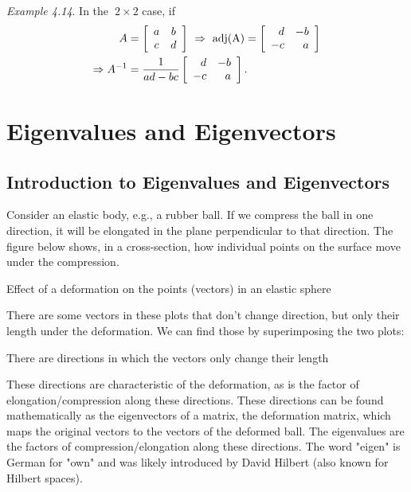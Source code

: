 \documentclass[
  letterpaper,
  DIV=11,
  numbers=noendperiod]{scrartcl}
\theoremstyle{remark}
\begin{document}
\emph{Example 4.14}. In the\textbf{~}\(2\times 2\) case, if
\[\begin{aligned}
A&=\left[ 
\begin{array}{cc}
a & b \\ 
c & d
\end{array}
\right] \ \Rightarrow  \  {\rm adj}({\rm A}) = \left[\begin{array}{rr}
d & -b \\ 
-c & a
\end{array}
\right]  \\
 \Rightarrow A^{-1} &= \frac{1}{ad-bc}\left[ 
\begin{array}{rr}
d & -b \\ 
-c & a
\end{array}
\right].  
\end{aligned}\]

\section{Eigenvalues and
Eigenvectors}\label{eigenvalues-and-eigenvectors}

\subsection{Introduction to Eigenvalues and
Eigenvectors}\label{introduction-to-eigenvalues-and-eigenvectors}

Consider an elastic body, e.g., a rubber ball. If we compress the ball
in one direction, it will be elongated in the plane perpendicular to
that direction. The figure below shows, in a cross-section, how
individual points on the surface move under the compression.

Effect of a deformation on the points (vectors) in an elastic sphere

There are some vectors in these plots that don't change direction, but
only their length under the deformation. We can find those by
superimposing the two plots:

There are directions in which the vectors only change their length

These directions are characteristic of the deformation, as is the factor
of elongation/compression along these directions. These directions can
be found mathematically as the eigenvectors of a matrix, the deformation
matrix, which maps the original vectors to the vectors of the deformed
ball. The eigenvalues are the factors of compression/elongation along
these directions. The word "eigen" is German for "own" and was likely
introduced by David Hilbert (also known for Hilbert spaces).
\end{document}

